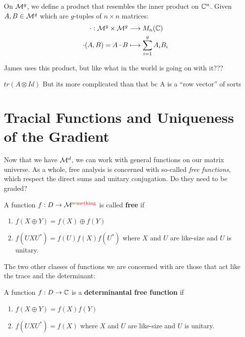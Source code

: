 On \(\mathcal{M}^{g} \), we define a product that resembles the inner product on
\(\mathbb{C}^n\). Given \(A,B \in \mathcal{M}^{g} \) which are \(g\)-tuples of \(n \times n\)
matrices:
\begin{align*}
	\cdot : \mathcal{M}^{g} \times \mathcal{M}^{g}  &\longrightarrow M_n(\mathbb{C}) \\
  \cdot (A,B) = A \cdot B &\longmapsto \sum_{i=1}^g A_i B_i
\end{align*}

{\color{red} James uses this product, but like what in the world is going on
  with it???}

{\color{red} \(tr (A \otimes Id)\) But its more complicated than that bc A is a
``row vector'' of sorts}


\section{Tracial Functions and Uniqueness of the Gradient}%
\label{sec:TracGrad}
Now that we have \(\mathcal{M}^d\), we can work with general functions on our matrix
universe. As a whole, free analysis is concerned with so-called \emph{free
  functions}, which respect the direct sums and unitary conjugation.
{\color{red} Do they need to be graded?}
\begin{definition}
\label{def:FreeFun}
  A function \(f: D\to \mathcal{M}^{\color{red} \text{something}}\) is called \textbf{free} if
  \begin{enumerate}
    \item \(f(X\oplus Y)= f(X) \oplus f(Y)\)
    \item \(f(U X U^*) = f(U)f(X)f(U^*)\) where \(X\) and \(U\) are like-size
          and \(U\) is unitary.
  \end{enumerate}
\end{definition}

The two other classes of functions we are concerned with are those that act like
the trace and the determinant:
\begin{definition}
  \label{def:DetFreeFun}
  A function \(f: D \to \mathbb{C} \) is a \textbf{determinantal free function} if
  \begin{enumerate}
    \item \(f(X\oplus Y) = f(X)f(Y)\)
    \item \(f(U X U^*) = f(X)\) where \(X\) and \(U\) are like-size
          and \(U\) is unitary.
  \end{enumerate}
\end{definition}

